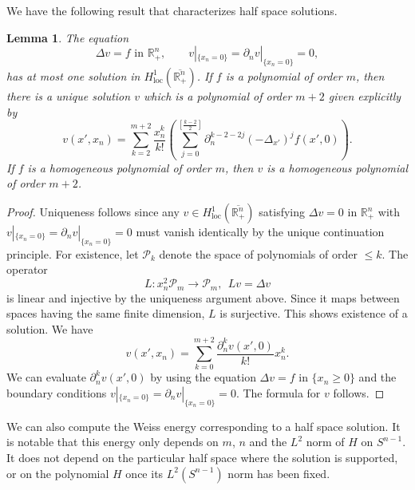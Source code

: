 \documentclass[11pt,a4paper]{amsart}
\newtheorem{Lemma}[Theorem]{Lemma}
\theoremstyle{definition}
\numberwithin{equation}{section}
\newcommand{\mR}{\mathbb{R}}                    %
\newcommand{\ol}[1]{\overline{#1}}
\newcommand{\p}{\partial}
\begin{document}
We have the following result that characterizes half space solutions.

\begin{Lemma} \label{lemma_half_space}
The equation 
\[
\Delta v = f \text{ in $\mR^n_+$}, \qquad v|_{\{x_n=0\}} = \p_n v|_{\{x_n=0\}} = 0,
\]
has at most one solution in $H^1_{\mathrm{loc}}(\ol{\mR^n_+})$. If $f$ is a polynomial of order $m$, then there is a unique solution $v$ which is a polynomial of order $m+2$ given explicitly by 
\[
v(x', x_n) = \sum_{k=2}^{m+2} \frac{x_n^k}{k!} \left(  \sum_{j=0}^{[\frac{k-2}{2}]} \p_n^{k-2-2j} (-\Delta_{x'})^j f(x',0) \right).
\]
If $f$ is a homogeneous polynomial of order $m$, then $v$ is a homogeneous polynomial of order $m+2$.
\end{Lemma}
\begin{proof}
Uniqueness follows since any $v \in H^1_{\mathrm{loc}}(\ol{\mR^n_+})$ satisfying $\Delta v = 0$ in $\mR^n_+$ with $v|_{\{x_n=0\}} = \p_n v|_{\{x_n=0\}} = 0$ must vanish identically by the unique continuation principle. For existence, let $\mathcal{P}_k$ denote the space of polynomials of order $\leq k$. The operator 
\[
L: x_n^2 \mathcal{P}_m \to \mathcal{P}_m, \ \ Lv = \Delta v
\]
is linear and injective by the uniqueness argument above. Since it maps between spaces having the same finite dimension, $L$ is surjective. This shows existence of a solution. We have 
\[
v(x',x_n) = \sum_{k=0}^{m+2} \frac{\p_n^k v(x',0)}{k!} x_n^k.
\]
We can evaluate $\p_n^k v(x',0)$ by using the equation $\Delta v = f$ in $\{ x_n \geq 0 \}$ and the boundary conditions $v|_{\{x_n=0\}} = \p_n v|_{\{x_n=0\}} = 0$. The formula for $v$ follows.
\end{proof}


We can also compute the Weiss energy corresponding to a half space solution. It is notable that this energy only depends on  $m$, $n$ and the $L^2$ norm of $H$ on $S^{n-1}$. It does not depend on the particular half space where the solution is supported, or on the polynomial $H$ once its $L^2(S^{n-1})$ norm has been fixed.
\end{document}
